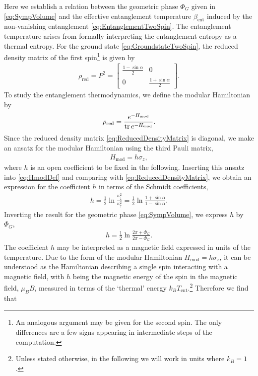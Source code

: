 \documentclass[a4paper,11pt]{article}
\newcommand{\1}{\mathds{1}}
\begin{document}
Here we establish a relation between the geometric phase $\Phi_G$ given in \eqref{eq:SympVolume} and the effective entanglement temperature $\beta_{\text{ent}}$ induced by the non-vanishing entanglement \eqref{eq:EntanglementTwoSpin}. The entanglement temperature arises from formally interpreting the entanglement entropy as a thermal entropy. For the ground state \eqref{eq:GroundstateTwoSpin}, the reduced density matrix of the first spin\footnote{An analogous argument may be given for the second spin. The only differences are a few signs appearing in intermediate steps of the computation.} is given by
\begin{align}
    \rho_{\text{red}}=P^2=\begin{bmatrix}\frac{1-\sin\alpha}{2}&0\\0&\frac{1+\sin\alpha}{2}\end{bmatrix}.\label{eq:ReducedDensityMatrix}
\end{align}
To study the entanglement thermodynamics, we define the modular Hamiltonian by
\begin{align}
    \rho_{\text{red}}=\frac{e^{-H_{\text{mod}}}}{\tr e^{-H_{\text{mod}}}}.\label{eq:HmodDef}
\end{align}
Since the reduced density matrix \eqref{eq:ReducedDensityMatrix} is diagonal, we make an ansatz for the modular Hamiltonian using the third Pauli matrix,
\begin{align}
    H_{\text{mod}}=h\sigma_z,
\end{align}
where $h$ is an open coefficient to be fixed in the following. Inserting this ansatz into \eqref{eq:HmodDef} and comparing with \eqref{eq:ReducedDensityMatrix}, we obtain an expression for the coefficient $h$ in terms of the Schmidt coefficients,
\begin{align}
    h=\frac{1}{2}\ln\frac{\kappa_\downarrow^2}{\kappa_\uparrow^2}=\frac{1}{2}\ln\frac{1+\sin\alpha}{1-\sin\alpha}.
\end{align}
Inverting the result for the geometric phase \eqref{eq:SympVolume}, we express $h$ by $\Phi_G$,
\begin{align}
    h=\frac{1}{2}\ln\frac{2\pi+\Phi_G}{2\pi-\Phi_G}.
\end{align}
The coefficient $h$ may be interpreted as a magnetic field expressed in units of the temperature. Due to the form of the modular Hamiltonian $H_{\text{mod}}=h\sigma_z$, it can be understood as the Hamiltonian describing a single spin interacting with a magnetic field, with $h$ being the magnetic energy of the spin in the magnetic field, $\mu_BB$, measured in terms of the `thermal' energy $k_BT_{\text{ent}}$.\footnote{Unless stated otherwise, in the following we will work in units where $k_B=1$.} Therefore we find that
\end{document}
